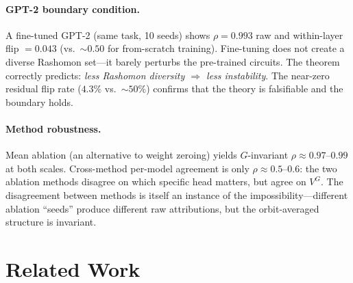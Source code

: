 \documentclass{article}
\begin{document}
\paragraph{GPT-2 boundary condition.}
A fine-tuned GPT-2 (same task, 10 seeds) shows $\rho = 0.993$ raw and within-layer flip $= 0.043$ (vs.\ ${\sim}0.50$ for from-scratch training). Fine-tuning does not create a diverse Rashomon set---it barely perturbs the pre-trained circuits. The theorem correctly predicts: \emph{less Rashomon diversity $\Rightarrow$ less instability}. The near-zero residual flip rate ($4.3\%$ vs.\ ${\sim}50\%$) confirms that the theory is falsifiable and the boundary holds.

\paragraph{Method robustness.}
Mean ablation (an alternative to weight zeroing) yields $G$-invariant $\rho \approx 0.97$--$0.99$ at both scales. Cross-method per-model agreement is only $\rho \approx 0.5$--$0.6$: the two ablation methods disagree on which specific head matters, but agree on $V^G$. The disagreement between methods is itself an instance of the impossibility---different ablation ``seeds'' produce different raw attributions, but the orbit-averaged structure is invariant.

\section{Related Work}
\label{sec:related}
\end{document}
